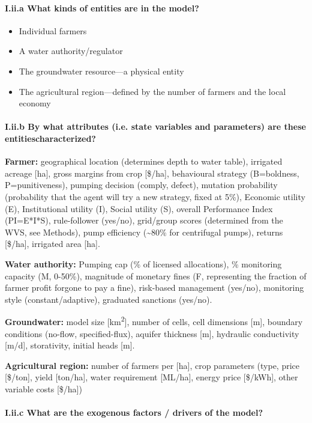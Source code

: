 \documentclass[12pt, a4paper]{article}
\begin{document}
\paragraph{I.ii.a What kinds of entities are in the model?}

\begin{itemize} \item Individual farmers \item A water authority/regulator \item The groundwater resource---a physical entity \item The agricultural region---defined by the number of farmers and the local economy \end{itemize}

\paragraph{I.ii.b By what attributes (i.e. state variables and parameters) are these entitiescharacterized?}

\textbf{Farmer:} geographical location (determines depth to water table), irrigated acreage [ha], gross margins from crop [\$/ha], behavioural strategy (B=boldness, P=punitiveness), pumping decision (comply, defect), mutation probability (probability that the agent will try a new strategy, fixed at 5\%), Economic utility (E), Institutional utility (I), Social utility (S), overall Performance Index (PI=E*I*S), rule-follower (yes/no), grid/group scores (determined from the WVS, see Methods), pump efficiency (\textasciitilde{}80\% for centrifugal pumps), returns [\$/ha], irrigated area [ha].

\textbf{Water authority:} Pumping cap (\% of licensed allocations), \% monitoring capacity (M, 0-50\%), magnitude of monetary fines (F, representing the fraction of farmer profit forgone to pay a fine), risk-based management (yes/no), monitoring style (constant/adaptive), graduated sanctions (yes/no).

\textbf{Groundwater:} model size [km\textsuperscript{2}], number of cells, cell dimensions [m], boundary conditions (no-flow, specified-flux), aquifer thickness [m], hydraulic conductivity [m/d], storativity, initial heads [m].

\textbf{Agricultural region:} number of farmers per [ha], crop parameters (type, price [\$/ton], yield [ton/ha], water requirement [ML/ha], energy price [\$/kWh], other variable costs [\$/ha])

\paragraph{I.ii.c What are the exogenous factors / drivers of the model?}
\end{document}
